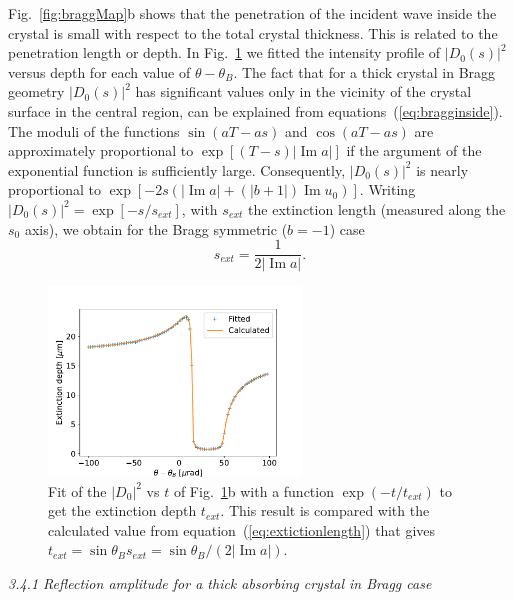\documentclass[preprint]{iucr}              %
\begin{document}
Fig.~\ref{fig:braggMap}b shows that the penetration of the incident wave inside the crystal is small with respect to the total crystal thickness. This is related to the penetration length or depth. In Fig.~\ref{fig:penetration} we fitted the intensity profile of $|D_0(s)|^2$ versus depth for each value of $\theta-\theta_B$.
The fact that for a thick crystal in Bragg geometry $|D_0(s)|^2$ has significant values only in the vicinity of the crystal surface in the central region, can be explained from equations~(\ref{eq:bragginside}). The moduli of the functions $\sin(aT-as)$ and $\cos(aT-as)$ are approximately proportional to $\exp[(T-s)|\operatorname{Im}a|]$ if the argument of the exponential function is sufficiently large. Consequently, $|D_0(s)|^2$ is nearly proportional to $\exp[-2s(|\operatorname{Im}a|+(|b+1|)\operatorname{Im}u_0)]$. Writing $|D_0(s)|^2=\exp[-s/s_{ext}]$, with $s_{ext}$ the extinction length (measured along the $s_0$ axis), we obtain for the Bragg symmetric ($b=-1$) case  
\begin{equation}\label{eq:extictionlength}
    s_{ext} = \frac{1}{2 |\operatorname{Im}a|}.
\end{equation}

\begin{figure}\label{fig:penetration}
    \centering
    \includegraphics[width=0.6\textwidth]{figures/penetration.pdf}

    \caption{Fit of the $|D_0|^2$ vs $t$ of Fig.~\ref{fig:penetration}b with a function $\exp(-t/t_{ext})$ to get the extinction depth $t_{ext}$. This result is compared with the calculated value from equation~(\ref{eq:extictionlength}) that gives $t_{ext}=\sin\theta_B s_{ext} = \sin\theta_B/(2 |\operatorname{Im} a|)$.
    }
\end{figure}

\textit{3.4.1  Reflection amplitude for a thick absorbing crystal in Bragg case}
\end{document}

